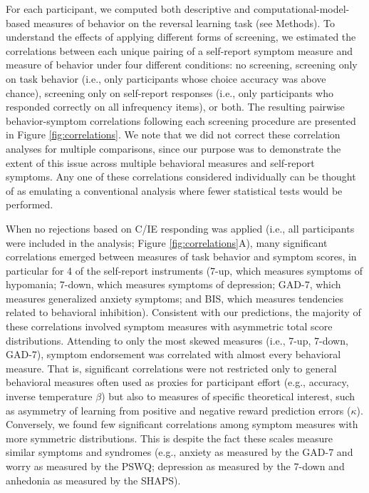 \documentclass[a4paper,notitlepage,12pt]{article}
\begin{document}
\begin{refsection}[main]
For each participant, we computed both descriptive and computational-model-based measures of behavior on the reversal learning task (see Methods). To understand the effects of applying different forms of screening, we estimated the correlations between each unique pairing of a self-report symptom measure and measure of behavior under four different conditions: no screening, screening only on task behavior (i.e., only participants whose choice accuracy was above chance), screening only on self-report responses (i.e., only participants who responded correctly on all infrequency items), or both. The resulting pairwise behavior-symptom correlations following each screening procedure are presented in Figure \ref{fig:correlations}. We note that we did not correct these correlation analyses for multiple comparisons, since our purpose was to demonstrate the extent of this issue across multiple behavioral measures and self-report symptoms. Any one of these correlations considered individually can be thought of as emulating a conventional analysis where fewer statistical tests would be performed.

When no rejections based on C/IE responding was applied (i.e., all participants were included in the analysis; Figure \ref{fig:correlations}A), many significant correlations emerged between measures of task behavior and symptom scores, in particular for 4 of the self-report instruments (7-up, which measures symptoms of hypomania; 7-down, which measures symptoms of depression; GAD-7, which measures generalized anxiety symptoms; and BIS, which measures tendencies related to behavioral inhibition). Consistent with our predictions, the majority of these correlations involved symptom measures with asymmetric total score distributions. Attending to only the most skewed measures (i.e., 7-up, 7-down, GAD-7), symptom endorsement was correlated with almost every behavioral measure. That is, significant correlations were not restricted only to general behavioral measures often used as proxies for participant effort (e.g., accuracy, inverse temperature $\beta$) but also to measures of specific theoretical interest, such as asymmetry of learning from positive and negative reward prediction errors ($\kappa$). Conversely, we found few significant correlations among symptom measures with more symmetric distributions. This is despite the fact these scales measure similar symptoms and syndromes (e.g., anxiety as measured by the GAD-7 and worry as measured by the PSWQ; depression as measured by the 7-down and anhedonia as measured by the SHAPS). 


\end{refsection}
\end{document}
